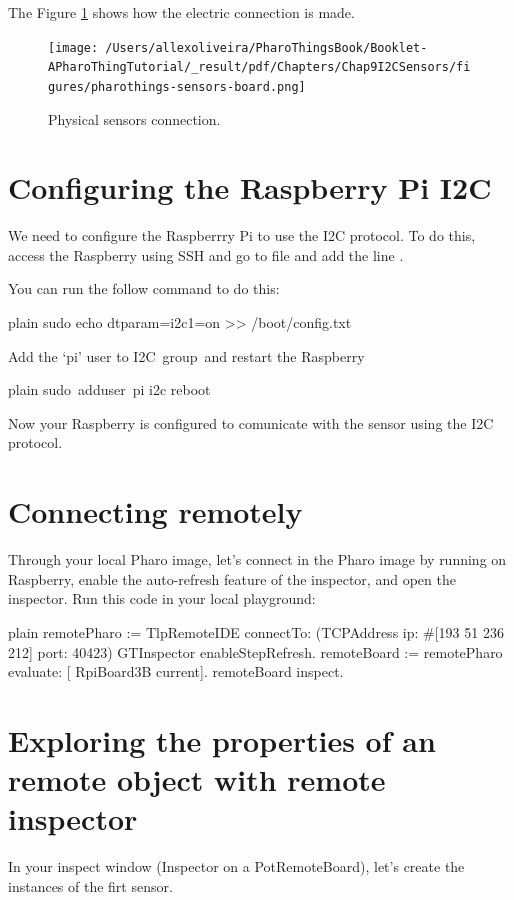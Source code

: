 \documentclass[10pt,twoside,english]{_support/latex/sbabook/sbabook}
\begin{document}
The Figure \ref{physicalSensors} shows how the electric connection is made.


\begin{figure}

\begin{center}
\texttt{[image: /Users/allexoliveira/PharoThingsBook/Booklet-APharoThingTutorial/\_result/pdf/Chapters/Chap9I2CSensors/figures/pharothings-sensors-board.png]}\caption{Physical sensors connection.\label{physicalSensors}}\end{center}
\end{figure}

\section{Configuring the Raspberry Pi I2C}
We need to configure the Raspberrry Pi to use the I2C protocol. To do this, access the Raspberry using SSH and go to file  and add the line .

You can run the follow command to do this:

\begin{displaycode}{plain}
sudo echo dtparam=i2c1=on >> /boot/config.txt
\end{displaycode}

Add the ‘pi’ user to I2C group and restart the Raspberry 

\begin{displaycode}{plain}
sudo adduser pi i2c 
reboot
\end{displaycode}

Now your Raspberry is configured to comunicate with the sensor using the I2C protocol. 
\section{Connecting remotely}
Through your local Pharo image, let’s connect in the Pharo image by running on Raspberry, enable the auto-refresh feature of the inspector, and open the inspector.
Run this code in your local playground:

\begin{displaycode}{plain}
remotePharo := TlpRemoteIDE connectTo: (TCPAddress ip: #[193 51 236 212] port: 40423)
GTInspector enableStepRefresh.
remoteBoard := remotePharo evaluate: [ RpiBoard3B current].
remoteBoard inspect.
\end{displaycode}
\section{Exploring the properties of an remote object with remote inspector}
In your inspect window (Inspector on a PotRemoteBoard), let’s create the instances of the firt sensor. 
\end{document}
